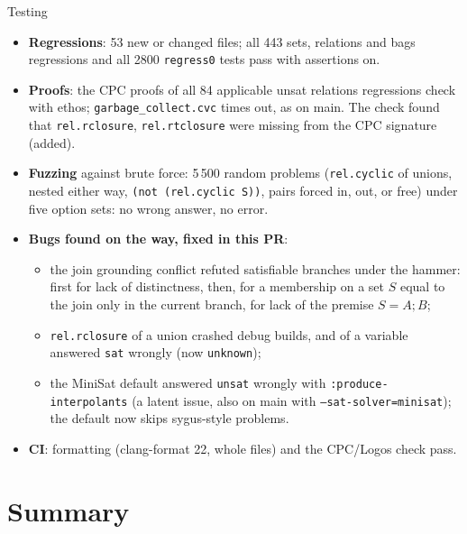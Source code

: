 \documentclass[aspectratio=169]{beamer}
\newcommand{\sm}[1]{\texttt{#1}}
\begin{document}
\begin{frame}{Testing}
  \footnotesize
  \begin{itemize}
    \item \textbf{Regressions}: 53 new or changed files; all 443 sets, relations and bags
      regressions and all 2800 \sm{regress0} tests pass with assertions on.
    \item \textbf{Proofs}: the CPC proofs of all 84 applicable unsat relations regressions check
      with ethos; \sm{garbage\_collect.cvc} times out, as on main. The check found that
      \sm{rel.rclosure}, \sm{rel.rtclosure} were missing from the CPC signature (added).
    \item \textbf{Fuzzing} against brute force: 5\,500 random problems
      (\sm{rel.cyclic} of unions, nested either way, \sm{(not (rel.cyclic S))}, pairs forced in,
      out, or free) under five option sets: no wrong answer, no error.
    \item \textbf{Bugs found on the way, fixed in this PR}:
      \begin{itemize}
        \item the join grounding conflict refuted satisfiable branches under the hammer: first
          for lack of distinctness, then, for a membership on a set $S$ equal to the join only in
          the current branch, for lack of the premise $S = A;B$;
        \item \sm{rel.rclosure} of a union crashed debug builds, and of a variable answered
          \sm{sat} wrongly (now \sm{unknown});
        \item the MiniSat default answered \sm{unsat} wrongly with \sm{:produce-interpolants} (a
          latent issue, also on main with \sm{--sat-solver=minisat}); the default now skips
          sygus-style problems.
      \end{itemize}
    \item \textbf{CI}: formatting (clang-format 22, whole files) and the CPC/Logos check pass.
  \end{itemize}
\end{frame}

\section{Summary}
\end{document}
